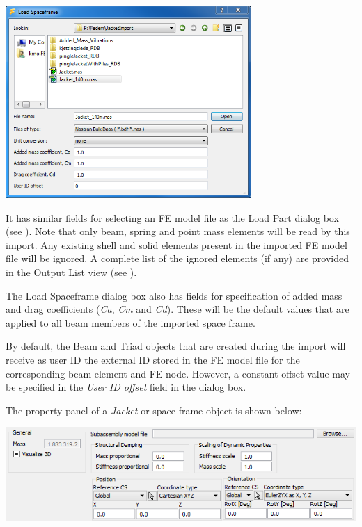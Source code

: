 

\includegraphics[width=0.7\textwidth]{Figures/4a-LoadSpaceframe}

It has similar fields for selecting an FE model file as the Load Part dialog box
(see ).
Note that only beam, spring and point mass elements will be read by this import.
Any existing shell and solid elements present in the imported FE model file will
be ignored. A complete list of the ignored elements (if any) are provided in the
Output List view (see ).

The Load Spaceframe dialog box also has fields for specification of added mass
and drag coefficients ({\sl Ca}, {\sl Cm} and {\sl Cd}). These will be the
default values that are applied to all beam members of the imported space frame.

By default, the Beam and Triad objects that are created during the import will
receive as user ID the external ID stored in the FE model file for the
corresponding beam element and FE node. However, a constant offset value may be
specified in the {\sl User ID offset} field in the dialog box.



The property panel of a {\sl Jacket} or space frame object is shown below:

\noindent\includegraphics[width=\textwidth]{Figures/4a-JacketProperty}

